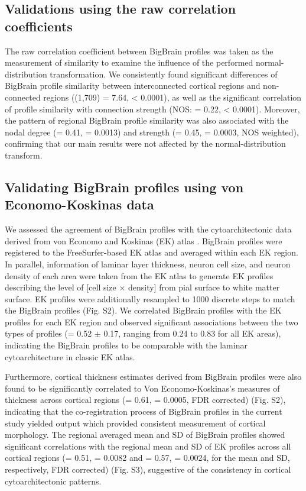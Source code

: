 \begin{refsection}
\subsection*{Validations using the raw correlation coefficients}
The raw correlation coefficient between BigBrain profiles was taken as the measurement of similarity to examine the influence of the performed normal-distribution transformation. We consistently found significant differences of BigBrain profile similarity between interconnected cortical regions and non-connected regions (\tvaldf(1,709) = 7.64, \pval < 0.0001), as well as the significant correlation of profile similarity with connection strength (NOS: \rval = 0.22, \pval < 0.0001). Moreover, the pattern of regional BigBrain profile similarity was also associated with the nodal degree (\rval = 0.41, \pval = 0.0013) and strength (\rval = 0.45, \pval = 0.0003, NOS weighted), confirming that our main results were not affected by the normal-distribution transform.

\subsection*{Validating BigBrain profiles using von Economo-Koskinas data}
We assessed the agreement of BigBrain profiles with the cytoarchitectonic data derived from von Economo and Koskinas (EK) atlas \citep{von1925cytoarchitektonik}. BigBrain profiles were registered to the FreeSurfer-based EK atlas \citep{Scholtens2015ECONOMO} and averaged within each EK region. In parallel, information of laminar layer thickness, neuron cell size, and neuron density of each area were taken from the EK atlas to generate EK profiles describing the level of [cell size $\times$ density] from pial surface to white matter surface. EK profiles were additionally resampled to 1000 discrete steps to match the BigBrain profiles (Fig. S2). We correlated BigBrain profiles with the EK profiles for each EK region and observed significant associations between the two types of profiles (\rval = 0.52 $\pm$ 0.17, ranging from 0.24 to 0.83 for all EK areas), indicating the BigBrain profiles to be comparable with the laminar cytoarchitecture in classic EK atlas.

Furthermore, cortical thickness estimates derived from BigBrain profiles were also found to be significantly correlated to Von Economo-Koskinas’s measures of thickness across cortical regions (\rval = 0.61, \pval = 0.0005, FDR corrected) (Fig. S2), indicating that the co-registration process of BigBrain profiles in the current study yielded output which provided consistent measurement of cortical morphology. The regional averaged mean and SD of BigBrain profiles showed significant correlations with the regional mean and SD of EK profiles across all cortical regions (\rval = 0.51, \pval = 0.0082 and \rval = 0.57, \pval = 0.0024, for the mean and SD, respectively, FDR corrected) (Fig. S3), suggestive of the consistency in cortical cytoarchitectonic patterns.


\end{refsection}

